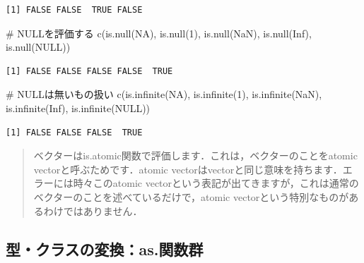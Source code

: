 \documentclass[
  letterpaper,
  DIV=11,
  numbers=noendperiod]{scrreprt}
\newenvironment{Shaded}{\begin{snugshade}}{\end{snugshade}}
\newcommand{\CommentTok}[1]{\textcolor[rgb]{0.37,0.37,0.37}{#1}}
\newcommand{\ConstantTok}[1]{\textcolor[rgb]{0.56,0.35,0.01}{#1}}
\newcommand{\DecValTok}[1]{\textcolor[rgb]{0.68,0.00,0.00}{#1}}
\newcommand{\FunctionTok}[1]{\textcolor[rgb]{0.28,0.35,0.67}{#1}}
\newcommand{\NormalTok}[1]{\textcolor[rgb]{0.00,0.23,0.31}{#1}}
\begin{document}
\begin{verbatim}
[1] FALSE FALSE  TRUE FALSE
\end{verbatim}

\begin{Shaded}
\begin{Highlighting}[]
\CommentTok{\# NULLを評価する}
\FunctionTok{c}\NormalTok{(}\FunctionTok{is.null}\NormalTok{(}\ConstantTok{NA}\NormalTok{), }\FunctionTok{is.null}\NormalTok{(}\DecValTok{1}\NormalTok{), }\FunctionTok{is.null}\NormalTok{(}\ConstantTok{NaN}\NormalTok{), }\FunctionTok{is.null}\NormalTok{(}\ConstantTok{Inf}\NormalTok{), }\FunctionTok{is.null}\NormalTok{(}\ConstantTok{NULL}\NormalTok{)) }
\end{Highlighting}
\end{Shaded}

\begin{verbatim}
[1] FALSE FALSE FALSE FALSE  TRUE
\end{verbatim}

\begin{Shaded}
\begin{Highlighting}[]
\CommentTok{\# NULLは無いもの扱い}
\FunctionTok{c}\NormalTok{(}\FunctionTok{is.infinite}\NormalTok{(}\ConstantTok{NA}\NormalTok{), }\FunctionTok{is.infinite}\NormalTok{(}\DecValTok{1}\NormalTok{), }\FunctionTok{is.infinite}\NormalTok{(}\ConstantTok{NaN}\NormalTok{), }\FunctionTok{is.infinite}\NormalTok{(}\ConstantTok{Inf}\NormalTok{), }\FunctionTok{is.infinite}\NormalTok{(}\ConstantTok{NULL}\NormalTok{)) }
\end{Highlighting}
\end{Shaded}

\begin{verbatim}
[1] FALSE FALSE FALSE  TRUE
\end{verbatim}

\begin{quote}
ベクターはis.atomic関数で評価します．これは，ベクターのことをatomic
vectorと呼ぶためです．atomic
vectorはvectorと同じ意味を持ちます．エラーには時々このatomic
vectorという表記が出てきますが，これは通常のベクターのことを述べているだけで，atomic
vectorという特別なものがあるわけではありません．
\end{quote}

\hypertarget{ux578bux30afux30e9ux30b9ux306eux5909ux63dbas.ux95a2ux6570ux7fa4}{%
\subsection{型・クラスの変換：as.関数群}\label{ux578bux30afux30e9ux30b9ux306eux5909ux63dbas.ux95a2ux6570ux7fa4}}
\end{document}

